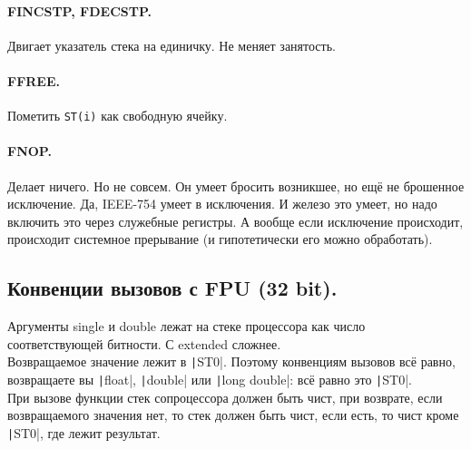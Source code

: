 \documentclass{article}
\begin{document}
    \paragraph{FINCSTP, FDECSTP.}
    Двигает указатель стека на единичку. Не меняет занятость.
    \paragraph{FFREE.}
    Пометить \Verb|ST(i)| как свободную ячейку.
    \paragraph{FNOP.}
    Делает ничего. Но не совсем. Он умеет бросить возникшее, но ещё не брошенное исключение. Да, IEEE-754 умеет в исключения. И железо это умеет, но надо включить это через служебные регистры. А вообще если исключение происходит, происходит системное прерывание (и гипотетически его можно обработать).
    \subsection{Конвенции вызовов с FPU (32 bit).}
    Аргументы single и double лежат на стеке процессора как число соответствующей битности. С extended сложнее.\\
    Возвращаемое значение лежит в \texttt|ST0|. Поэтому конвенциям вызовов всё равно, возвращаете вы \texttt|float|, \texttt|double| или \texttt|long double|: всё равно это \texttt|ST0|.\\
    При вызове функции стек сопроцессора должен быть чист, при возврате, если возвращаемого значения нет, то стек должен быть чист, если есть, то чист кроме \texttt|ST0|, где лежит результат.
\end{document}
